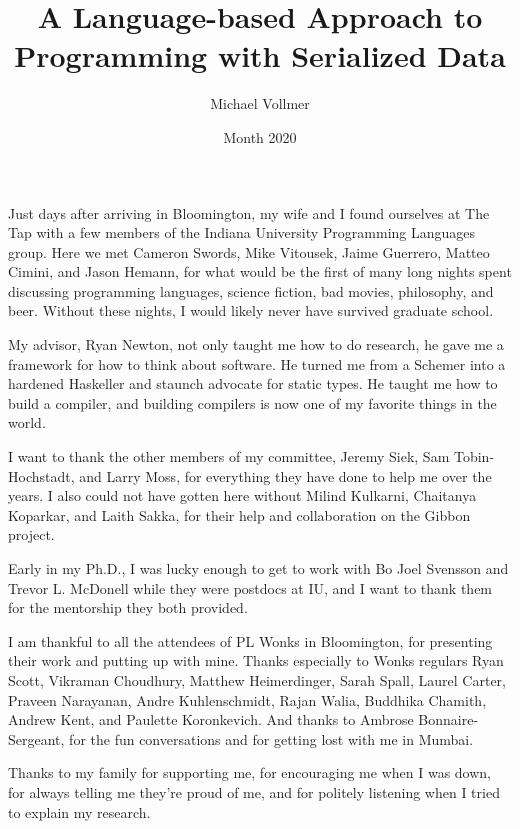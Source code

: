\documentclass[showabstract,showacknowledgments,showpreface,showdedication]{iuphd}
\title{A Language-based Approach to Programming with Serialized Data}
\author{Michael Vollmer}
\date{Month 2020} %
\theoremstyle{nonumberplain}
\begin{document}
\maketitle
\acceptancepage




\begin{acknowledgments}

  Just days after arriving in Bloomington, my wife and I found ourselves at The
  Tap with a few members of the Indiana University Programming Languages group.
  Here we met Cameron Swords, Mike Vitousek, Jaime Guerrero, Matteo Cimini, and
  Jason Hemann, for what would be the first of many long nights spent discussing
  programming languages, science fiction, bad movies, philosophy, and beer.
  Without these nights, I would likely never have survived graduate school.

  My advisor, Ryan Newton, not only taught me how to do research, he gave me a
  framework for how to think about software. He turned me from a Schemer into a
  hardened Haskeller and staunch advocate for static types. He taught me how to
  build a compiler, and building compilers is now one of my favorite things in the
  world.

  I want to thank the other members of my committee, Jeremy Siek, Sam
  Tobin-Hochstadt, and Larry Moss, for everything they have done to help me over
  the years. I also could not have gotten here without Milind Kulkarni, Chaitanya
  Koparkar, and Laith Sakka, for their help and collaboration on the Gibbon project.

  Early in my Ph.D., I was lucky enough to get to work with Bo Joel Svensson and
  Trevor L. McDonell while they were postdocs at IU, and I want to thank them for
  the mentorship they both provided.

  I am thankful to all the attendees of PL Wonks in Bloomington, for presenting
  their work and putting up with mine. Thanks especially to Wonks regulars Ryan
  Scott, Vikraman Choudhury, Matthew Heimerdinger, Sarah Spall, Laurel Carter,
  Praveen Narayanan, Andre Kuhlenschmidt, Rajan Walia, Buddhika Chamith, Andrew
  Kent, and Paulette Koronkevich. And thanks to Ambrose Bonnaire-Sergeant, for the
  fun conversations and for getting lost with me in Mumbai.

  Thanks to my family for supporting me, for encouraging me when I was down, for
  always telling me they're proud of me, and for politely listening when I tried
  to explain my research.


\end{acknowledgments}
\end{document}
